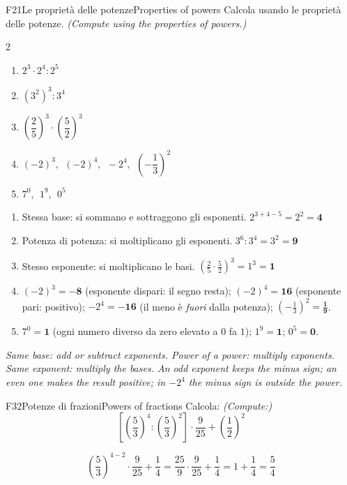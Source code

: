 \documentclass[11pt,a4paper]{article}
\newcommand{\en}[1]{\par{\small\itshape\color{engray}#1\par}}
\newcommand{\enx}[1]{{\small\itshape\color{engray}(#1)}}
\begin{document}
\begin{esercizio}{F2}{1}{Le proprietà delle potenze}{Properties of powers}
Calcola usando le proprietà delle potenze. \enx{Compute using the properties of powers.}
\begin{multicols}{2}
\begin{enumerate}
\item $2^3\cdot 2^4:2^5$
\item $(3^2)^3:3^4$
\item $\left(\dfrac25\right)^3\cdot\left(\dfrac52\right)^3$
\item $(-2)^3,\ \ (-2)^4,\ \ -2^4,\ \ \left(-\dfrac13\right)^2$
\item $7^0,\ \ 1^9,\ \ 0^5$
\end{enumerate}
\end{multicols}
\end{esercizio}
\begin{solbox}
\begin{enumerate}
\item Stessa base: si sommano e sottraggono gli esponenti. $2^{3+4-5}=2^2=\mathbf{4}$
\item Potenza di potenza: si moltiplicano gli esponenti. $3^{6}:3^4=3^{2}=\mathbf{9}$
\item Stesso esponente: si moltiplicano le basi. $\left(\frac25\cdot\frac52\right)^3=1^3=\mathbf{1}$
\item $(-2)^3=\mathbf{-8}$ (esponente dispari: il segno resta); $(-2)^4=\mathbf{16}$ (esponente pari: positivo); $-2^4=\mathbf{-16}$ (il meno è \emph{fuori} dalla potenza); $\left(-\frac13\right)^2=\mathbf{\frac19}$.
\item $7^0=\mathbf{1}$ (ogni numero diverso da zero elevato a $0$ fa $1$); $1^9=\mathbf{1}$; $0^5=\mathbf{0}$.
\end{enumerate}
\en{Same base: add or subtract exponents. Power of a power: multiply exponents. Same exponent: multiply the bases. An odd exponent keeps the minus sign; an even one makes the result positive; in $-2^4$ the minus sign is outside the power.}
\end{solbox}

\begin{esercizio}{F3}{2}{Potenze di frazioni}{Powers of fractions}
Calcola: \enx{Compute:}
\[\left[\left(\frac53\right)^4:\left(\frac53\right)^2\right]\cdot\frac{9}{25}+\left(\frac12\right)^2\]
\end{esercizio}
\begin{solbox}
\[
\left(\frac53\right)^{4-2}\cdot\frac{9}{25}+\frac14
=\frac{25}{9}\cdot\frac{9}{25}+\frac14
=1+\frac14=\boxed{\frac54}
\]
\end{solbox}
\end{document}
